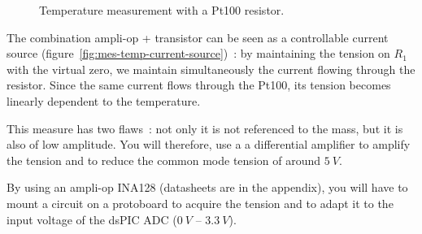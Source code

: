 \documentclass[11pt,a4paper]{article}
\theoremstyle{definition}%
\begin{document}
\begin{figure}[H]
\shorthandoff{:!;}
\center
\caption{Temperature measurement with a Pt100 resistor.}
\label{fig:mes-temp}
\shorthandon{:!;}
\end{figure}

The combination ampli-op + transistor  can be seen as a controllable current source (figure~\ref{fig:mes-temp-current-source})~: by maintaining the tension on $R_1$ with the virtual zero, we maintain simultaneously the current flowing through the resistor.
Since the same current flows through the Pt100, its tension becomes linearly dependent to the temperature.

This measure has two flaws~: not only it is not referenced to the mass, but it is also of low amplitude.
You will therefore, use a a differential amplifier to amplify the tension and to reduce the common mode tension of around $5~V$.

By using an ampli-op INA128 (datasheets are in the appendix), you will have to mount a circuit on a protoboard to acquire the tension and to adapt it to the input voltage of the dsPIC ADC ($0~V$ -- $3.3~V$).
\end{document}
